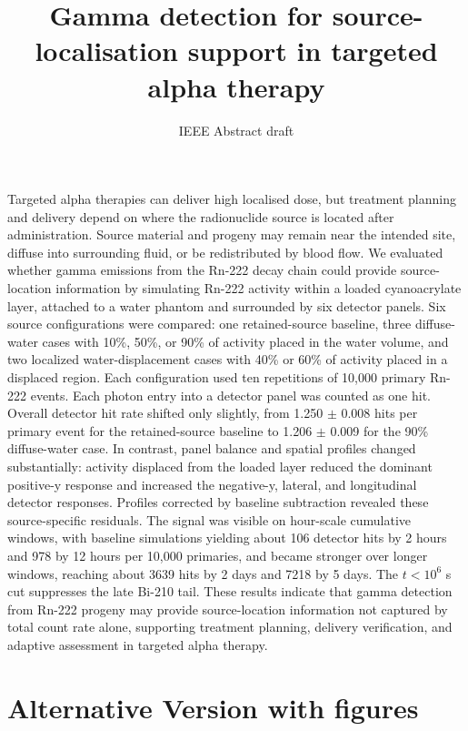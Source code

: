 \documentclass[11pt,a4paper]{article}
\title{Gamma detection for source-localisation support in targeted alpha therapy}
\author{IEEE Abstract draft}
\date{}
\begin{document}
\maketitle

Targeted alpha therapies can deliver high localised dose, but treatment planning
and delivery depend on where the radionuclide source is located
after administration. Source material and progeny may remain near the
intended site, diffuse into surrounding fluid, or be redistributed by blood
flow. We evaluated whether gamma emissions from the
Rn-222 decay chain could provide source-location information by simulating
Rn-222 activity within a loaded cyanoacrylate layer, attached to a water phantom
and surrounded by six detector panels. Six source configurations were
compared: one retained-source baseline, three diffuse-water cases with 10\%,
50\%, or 90\% of activity placed in the water volume, and two localized
water-displacement cases with 40\% or 60\% of activity placed in a displaced
region. Each configuration used ten repetitions of 10,000
primary Rn-222 events. Each photon entry into a detector panel was counted
as one hit. Overall detector hit rate shifted only slightly, from
1.250 $\pm$ 0.008 hits per primary event for the retained-source baseline
to 1.206 $\pm$ 0.009 for the 90\% diffuse-water case. In contrast, panel
balance and spatial profiles changed substantially: activity displaced from
the loaded layer reduced the dominant positive-y response and increased the
negative-y, lateral, and longitudinal detector responses. Profiles corrected by baseline subtraction revealed these source-specific residuals. The signal was visible on
hour-scale cumulative windows, with baseline simulations yielding about 106
detector hits by 2 hours and 978 by 12 hours per 10,000 primaries, and
became stronger over longer windows, reaching about 3639 hits by 2 days
and 7218 by 5 days. The \(t<10^6\) s cut suppresses the late Bi-210 tail.
These results indicate that gamma detection from Rn-222
progeny may provide source-location information not captured by total count
rate alone, supporting treatment planning, delivery verification, and
adaptive assessment in targeted alpha therapy.

\newpage

\section*{Alternative Version with figures}
\end{document}
